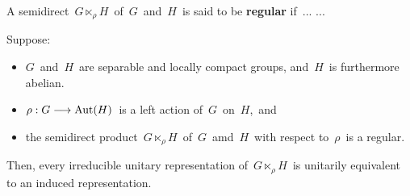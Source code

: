 

\vskip 0.5cm
\begin{definition}
\mbox{}
\vskip 0.1cm
\noindent
A semidirect
\,$G \ltimes_{\rho}\! H$\, of \,$G$\, and \,$H$\,
is said to be \textbf{regular} if \,... ...
\end{definition}


\vskip 0.5cm
\begin{theorem}
\mbox{}
\vskip 0.1cm
\noindent
Suppose:
\begin{itemize}
\item
	$G$\, and \,$H$\, are separable and locally compact groups, and
	\,$H$\, is furthermore abelian.
\item
	$\rho : G \longrightarrow \textnormal{Aut}(H)$\,
	is a left action of \,$G$\, on \,$H$,\, and
\item
	the semidirect product
	\,$G \ltimes_{\rho}\! H$\, of \,$G$\, amd \,$H$\,
	with respect to \,$\rho$\,
	is a regular.
\end{itemize}
Then, every irreducible unitary representation of
\,$G \ltimes_{\rho}\! H$\,
is unitarily equivalent to an induced representation.
\end{theorem}


